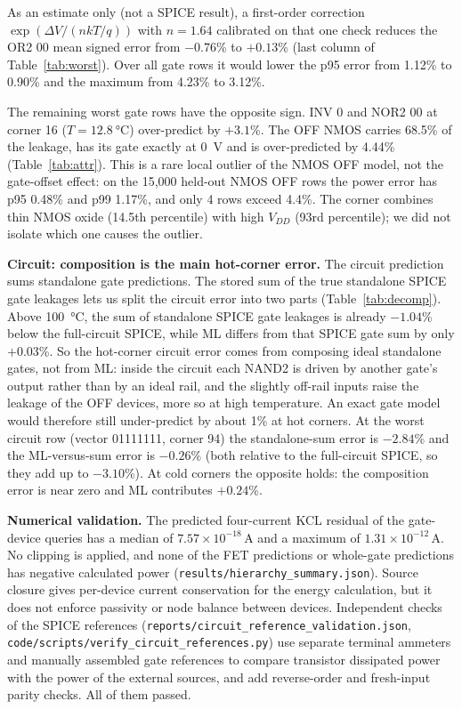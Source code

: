 As an estimate only (not a SPICE result), a first-order correction $\exp(\Delta V/(nkT/q))$ with $n=1.64$ calibrated on that one check reduces the OR2 00 mean signed error from $-0.76$\% to $+0.13$\% (last column of Table~\ref{tab:worst}). Over all gate rows it would lower the p95 error from 1.12\% to 0.90\% and the maximum from 4.23\% to 3.12\%.

The remaining worst gate rows have the opposite sign. INV 0 and NOR2 00 at corner 16 ($T=\SI{12.8}{\celsius}$) over-predict by $+3.1$\%. The OFF NMOS carries 68.5\% of the leakage, has its gate exactly at 0~V and is over-predicted by 4.44\% (Table~\ref{tab:attr}). This is a rare local outlier of the NMOS OFF model, not the gate-offset effect: on the 15,000 held-out NMOS OFF rows the power error has p95 0.48\% and p99 1.17\%, and only 4 rows exceed 4.4\%. The corner combines thin NMOS oxide (14.5th percentile) with high $V_{DD}$ (93rd percentile); we did not isolate which one causes the outlier.

\textbf{Circuit: composition is the main hot-corner error.} The circuit prediction sums standalone gate predictions. The stored sum of the true standalone SPICE gate leakages lets us split the circuit error into two parts (Table~\ref{tab:decomp}). Above \SI{100}{\celsius}, the sum of standalone SPICE gate leakages is already $-1.04$\% below the full-circuit SPICE, while ML differs from that SPICE gate sum by only $+0.03$\%. So the hot-corner circuit error comes from composing ideal standalone gates, not from ML: inside the circuit each NAND2 is driven by another gate's output rather than by an ideal rail, and the slightly off-rail inputs raise the leakage of the OFF devices, more so at high temperature. An exact gate model would therefore still under-predict by about 1\% at hot corners. At the worst circuit row (vector 01111111, corner 94) the standalone-sum error is $-2.84$\% and the ML-versus-sum error is $-0.26$\% (both relative to the full-circuit SPICE, so they add up to $-3.10$\%). At cold corners the opposite holds: the composition error is near zero and ML contributes $+0.24$\%.



\textbf{Numerical validation.} The predicted four-current KCL residual of the gate-device queries has a median of $7.57\times10^{-18}$\,A and a maximum of $1.31\times10^{-12}$\,A. No clipping is applied, and none of the FET predictions or whole-gate predictions has negative calculated power (\texttt{results/hierarchy\_summary.json}). Source closure gives per-device current conservation for the energy calculation, but it does not enforce passivity or node balance between devices. Independent checks of the SPICE references (\texttt{reports/circuit\_reference\_validation.json}, \texttt{code/scripts/verify\_circuit\_references.py}) use separate terminal ammeters and manually assembled gate references to compare transistor dissipated power with the power of the external sources, and add reverse-order and fresh-input parity checks. All of them passed.

